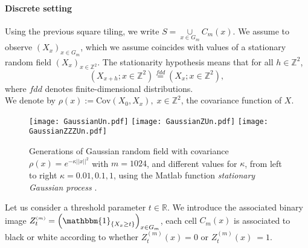 \documentclass[12pt]{article}
\theoremstyle{Theorem}
\begin{document}
\paragraph{Discrete setting}
Using the previous square tiling, we write $S =  \underset{x \in G_m}{\cup}  C_{m}(x)$. We assume to observe $\left(X_{\scriptscriptstyle x}\right)_{x \in G_{m}}$, which we assume coincides with values of a stationary random field $\left(X_{\scriptscriptstyle x}\right)_{x \in \mathbb{Z}^{2}}$. The stationarity hypothesis means that for all $h \in \mathbb{Z}^{2}$, 
$$\left(X_{x+h}; x \in \mathbb{Z}^{2} \right)\overset{fdd}{=} \left(X_{\scriptscriptstyle x}; x \in \mathbb{Z}^{2} \right),$$ where $fdd$ denotes finite-dimensional distributions. \\
We denote by $\rho(x) :=\text{Cov}\left(X_{\scriptscriptstyle 0}, X_{\scriptscriptstyle x}\right), \; x \in \mathbb{Z}^{2}$, the covariance function of $X$.
\vspace{-1.5cm}
\begin{figure}[H]
    {\texttt{[image: GaussianUn.pdf]}}
    {\texttt{[image: GaussianZUn.pdf]}}
    {\texttt{[image: GaussianZZZUn.pdf]}}
    \vspace{-2cm}
 \caption{Generations of Gaussian random field with covariance $\rho(x) = e^{-\kappa||x||^{2}}$ with $m = 1024$, and different values for $\kappa$, from left to right $\kappa = 0.01, 0.1, 1$, using the Matlab function \textit{stationary Gaussian process} \cite{MATLAB}.}
\label{fig22}
\end{figure}
Let us consider a threshold parameter $t \in \mathbb{R}$. We introduce the associated binary image $Z^{\scriptscriptstyle (m)}_{t} = \left(\mathbbm{1}_{\left\{X_x \geq t\right\}} \right)_{x \in G_{m}}$, each cell $C_{m}(x)$ is associated to black or white according to whether $Z^{\scriptscriptstyle (m)}_{t} (x) = 0$ or $Z^{\scriptscriptstyle (m)}_{t}(x)~= 1$. 
\end{document}
